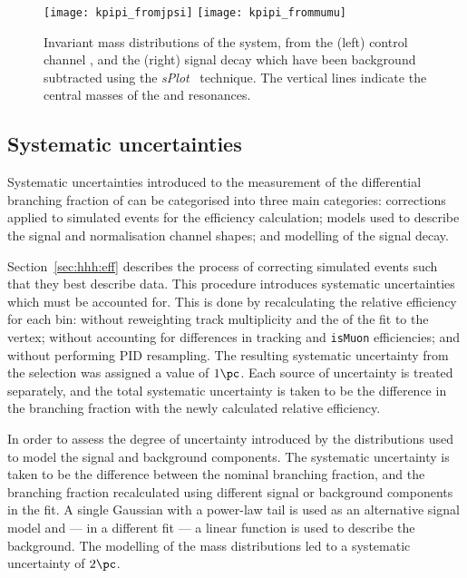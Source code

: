 \begin{figure}
  \begin{center}
    \texttt{[image: kpipi\_fromjpsi]}
    \texttt{[image: kpipi\_frommumu]}
    \caption[Invariant mass distributions of \kpipi in data]
    {
      Invariant mass distributions of the \kpipi system, from the
      (left) control channel \btojpsikpipi, and the
      (right) signal decay \btokpipimumu
      which have been background subtracted
      using the \emph{sPlot}~\cite{splot} technique.
      The vertical lines indicate the central masses of the  and 
      resonances.
    }
    \label{fig:kpipi:kpipi}
  \end{center}
\end{figure}



\subsection{Systematic uncertainties}
\label{ssec:kpipi:syst}

Systematic uncertainties introduced to the measurement of the differential branching fraction of
\btokpipimumu can be categorised into three main categories:
corrections applied to simulated events for the efficiency calculation;
models used to describe the signal and normalisation channel shapes; and
modelling of the signal decay.

Section~\ref{sec:hhh:eff} describes the process of correcting simulated events such that they best
describe data.
This procedure introduces systematic uncertainties which must be accounted for.
This is done by recalculating the relative efficiency for each \qsq bin:
without reweighting track multiplicity and the \chisq of the fit to the \Bp vertex;
without accounting for differences in tracking and {\tt isMuon} efficiencies;
and without performing PID resampling.
The resulting systematic uncertainty from the selection was assigned a value of $1\pc$.
Each source of uncertainty is treated separately, and the total systematic uncertainty is taken to
be the difference in the branching fraction with the newly calculated relative efficiency.

In order to assess the degree of uncertainty introduced by the distributions used to model the
signal and background components.
The systematic uncertainty is taken to be the difference between the nominal branching fraction,
and the branching fraction recalculated using different signal or background components in the fit.
A single Gaussian with a power-law tail is used as an alternative signal model and --- in a
different fit --- a linear function is used to describe the background.
The modelling of the mass distributions led to a systematic uncertainty of $2\pc$.

